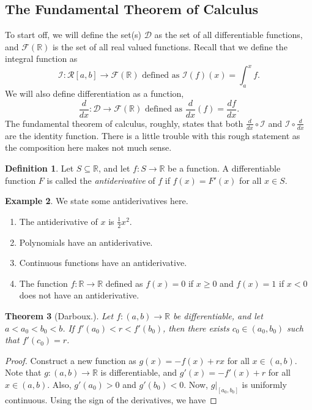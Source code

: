 \documentclass[15pt,a4paper]{book}
\newtheorem{theorem}{Theorem}[chapter]
\theoremstyle{definition}
\newtheorem{definition}[theorem]{Definition}
\newtheorem{example}[theorem]{Example}
\newcommand{\eax}[1]{\emph{#1}\index{#1}} %
\newcommand{\R}{\mathbb{R}} %
\newcommand{\cR}{\mathcal{R}}
\newcommand{\cI}{\mathcal{I}}
\newcommand{\cD}{\mathcal{D}}
\newcommand{\cF}{\mathcal{F}}
\begin{document}
\begin{enumerate}
\section{The Fundamental Theorem of Calculus}
To start off, we will define the set(s) $\cD$ as the set of all differentiable functions, and $\cF(\R)$ is the set of all real valued functions. Recall that we define the integral function as 
\begin{equation}
    \cI : \cR[a,b] \to \cF (\R) \text{ defined as } \cI (f) (x) = \int_{a}^{x}f.
\end{equation}
We will also define differentiation as a function,
\begin{equation}
    \frac{d}{dx} : \cD \to \cF(\R) \text{ defined as } \frac{d}{dx} (f) = \frac{df}{dx}. 
\end{equation}
The fundamental theorem of calculus, roughly, states that both $\frac{d}{dx} \circ \cI$ and $\cI \circ \frac{d}{dx}$ are the identity function. There is a little trouble with this rough statement as the composition here makes not much sense.
\begin{definition}
    Let $S \subseteq \R$, and let $f:S \to \R$ be a function. A differentiable function $F$ is called the \eax{antiderivative} of $f$ if $f(x) = F'(x)$ for all $x \in S$.
\end{definition}
\begin{example}
    We state some antiderivatives here.
    \begin{enumerate}
        \item The antiderivative of $x$ is $\frac{1}{2}x^{2}$.
        \item Polynomials have an antiderivative.
        \item Continuous functions have an antiderivative.
        \item The function $f:\R \to \R$ defined as $f(x) = 0$ if $x \geq 0$ and $f(x) = 1$ if $x < 0$ does not have an antiderivative.
    \end{enumerate}
\end{example}
\begin{theorem}[Darboux.]
    Let $f:(a,b) \to \R$ be differentiable, and let $a < a_{0} < b_{0} < b$. If $f'(a_{0}) < r < f'(b_{0})$, then there exists $c_{0} \in (a_{0},b_{0})$ such that $f'(c_{0}) = r$.    
\end{theorem}
\begin{proof}
    Construct a new function as $g(x) = - f(x) + rx$ for all $x \in (a,b)$. Note that $g:(a,b) \to \R$ is differentiable, and $g'(x) = -f'(x) + r$ for all $x \in (a,b)$. Also, $g'(a_{0}) > 0$ and $g'(b_{0}) < 0$. Now, $g|_{[a_{0},b_{0}]}$ is uniformly continuous. Using the sign of the derivatives, we have

\end{proof}
\end{enumerate}
\end{document}
